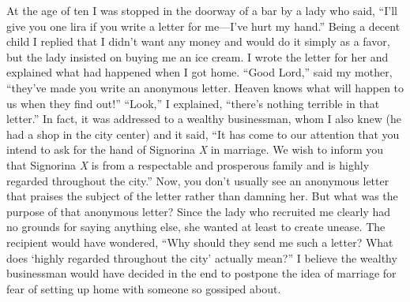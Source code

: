 \documentclass[11pt,twocolumn]{article}
\begin{document}
At the age of ten I was stopped in the doorway of a bar by a lady
who said, ``I'll give you one lira if you write a letter for me---I've
hurt my hand.'' Being a decent child I replied that I didn't want
any money and would do it simply as a favor, but the lady insisted
on buying me an ice cream. I wrote the letter for her and explained
what had happened when I got home. ``Good Lord,'' said my mother,
``they've made you write an anonymous letter. Heaven knows what will
happen to us when they find out!'' ``Look,'' I explained, ``there's
nothing terrible in that letter.'' In fact, it was addressed to a
wealthy businessman, whom I also knew (he had a shop in the city
center) and it said, ``It has come to our attention that you intend
to ask for the hand of Signorina {\em X} in marriage. We wish to inform
you that Signorina {\em X} is from a respectable and prosperous family
and is highly regarded throughout the city.'' Now, you don't usually
see an anonymous letter that praises the subject of the letter
rather than damning her. But what was the purpose of that anonymous
letter? Since the lady who recruited me clearly had no grounds for
saying anything else, she wanted at least to create unease. The
recipient would have wondered, ``Why should they send me such a
letter? What does `highly regarded throughout the city' actually
mean?'' I believe the wealthy businessman would have decided in the
end to postpone the idea of marriage for fear of setting up home
with someone so gossiped about.
\end{document}
